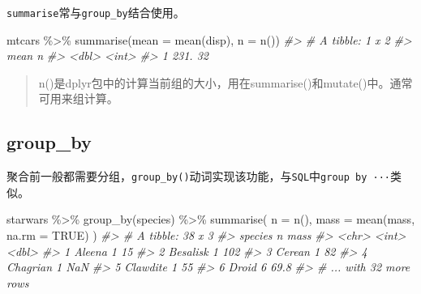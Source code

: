 \documentclass[
]{book}
\newenvironment{Shaded}{\begin{snugshade}}{\end{snugshade}}
\newcommand{\AttributeTok}[1]{\textcolor[rgb]{0.77,0.63,0.00}{#1}}
\newcommand{\CommentTok}[1]{\textcolor[rgb]{0.56,0.35,0.01}{\textit{#1}}}
\newcommand{\ConstantTok}[1]{\textcolor[rgb]{0.00,0.00,0.00}{#1}}
\newcommand{\FunctionTok}[1]{\textcolor[rgb]{0.00,0.00,0.00}{#1}}
\newcommand{\NormalTok}[1]{#1}
\newcommand{\SpecialCharTok}[1]{\textcolor[rgb]{0.00,0.00,0.00}{#1}}
\begin{document}
\texttt{summarise}常与\texttt{group\_by}结合使用。

\begin{Shaded}
\begin{Highlighting}[]
\NormalTok{mtcars }\SpecialCharTok{\%\textgreater{}\%}
  \FunctionTok{summarise}\NormalTok{(}\AttributeTok{mean =} \FunctionTok{mean}\NormalTok{(disp), }\AttributeTok{n =} \FunctionTok{n}\NormalTok{())}
\CommentTok{\#\textgreater{} \# A tibble: 1 x 2}
\CommentTok{\#\textgreater{}    mean     n}
\CommentTok{\#\textgreater{}   \textless{}dbl\textgreater{} \textless{}int\textgreater{}}
\CommentTok{\#\textgreater{} 1  231.    32}
\end{Highlighting}
\end{Shaded}

\begin{quote}
n()是dplyr包中的计算当前组的大小，用在summarise()和mutate()中。通常可用来组计算。
\end{quote}

\hypertarget{dplyr-groupby}{%
\subsection{group\_by}\label{dplyr-groupby}}

聚合前一般都需要分组，\texttt{group\_by()}动词实现该功能，与\texttt{SQL}中\texttt{group\ by\ ···}类似。

\begin{Shaded}
\begin{Highlighting}[]
\NormalTok{starwars }\SpecialCharTok{\%\textgreater{}\%}
  \FunctionTok{group\_by}\NormalTok{(species) }\SpecialCharTok{\%\textgreater{}\%}
  \FunctionTok{summarise}\NormalTok{(}
    \AttributeTok{n =} \FunctionTok{n}\NormalTok{(),}
    \AttributeTok{mass =} \FunctionTok{mean}\NormalTok{(mass, }\AttributeTok{na.rm =} \ConstantTok{TRUE}\NormalTok{)}
\NormalTok{  )}
\CommentTok{\#\textgreater{} \# A tibble: 38 x 3}
\CommentTok{\#\textgreater{}   species      n  mass}
\CommentTok{\#\textgreater{}   \textless{}chr\textgreater{}    \textless{}int\textgreater{} \textless{}dbl\textgreater{}}
\CommentTok{\#\textgreater{} 1 Aleena       1  15  }
\CommentTok{\#\textgreater{} 2 Besalisk     1 102  }
\CommentTok{\#\textgreater{} 3 Cerean       1  82  }
\CommentTok{\#\textgreater{} 4 Chagrian     1 NaN  }
\CommentTok{\#\textgreater{} 5 Clawdite     1  55  }
\CommentTok{\#\textgreater{} 6 Droid        6  69.8}
\CommentTok{\#\textgreater{} \# ... with 32 more rows}
\end{Highlighting}
\end{Shaded}
\end{document}
